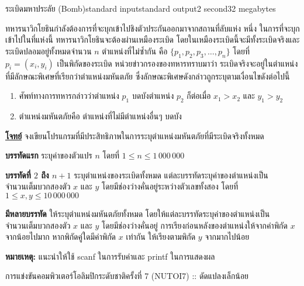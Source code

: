 \documentclass[11pt,a4paper]{article}
\begin{document}
\begin{problem}{ระเบิดมหาประลัย (Bomb)}{standard input}{standard output}{2 second}{32 megabytes}

ทหารนาวิกโยธินกำลังต้องการที่จะบุกเข้าไปชิงตัวประกันออกมาจากสถานที่ลับแห่ง หนึ่ง ในการที่จะบุกเข้าไปในที่แห่งนี้ ทหารนาวิกโยธินจะต้องผ่านเหมืองระเบิด โดยในเหมืองระเบิดนี้จะมีทั้งระเบิดจริงและระเบิดปลอมอยู่ทั้งหมดจำนวน $n$ ตำแหน่งที่ไม่ซ้ำกัน คือ $\{p_1,p_2,p_3,…,p_n\}$ โดยที่ $p_i = (x_i,y_i)$ เป็นพิกัดของระเบิด หน่วยข่าวกรองของทหารทราบมาว่า ระเบิดจริงจะอยู่ในตำแหน่งที่มีลักษณะพิเศษที่เรียกว่าตำแหน่งมหันตภัย ซึ่งลักษณะพิเศษดังกล่าวถูกระบุตามเงื่อนไขดังต่อไปนี้

\begin{enumerate}

\item ศัพท์ทางการทหารกล่าวว่าตำแหน่ง $p_1$ บดบังตำแหน่ง $p_2$ ก็ต่อเมื่อ $x_1 > x_2$ และ $y_1 > y_2$
\item ตำแหน่งมหันตภัยคือ ตำแหน่งที่ไม่มีตำแหน่งอื่นๆ บดบัง
\end{enumerate}


\bigskip
\underline{\textbf{โจทย์}}  จงเขียนโปรแกรมที่มีประสิทธิภาพในการระบุตำแหน่งมหันตภัยที่มีระเบิดจริงทั้งหมด


\InputFile

\textbf{บรรทัดแรก} ระบุค่าของตัวแปร $n$ โดยที่ $1 \leq n \leq 1\,000
\,000$

\textbf{บรรทัดที่ $2$ ถึง $n+1$} ระบุตำแหน่งของระเบิดทั้งหมด แต่ละบรรทัดระบุค่าของตำแหน่งเป็นจำนวนเต็มบวกสองตัว $x$ และ $y$ โดยมีช่องว่างคั่นอยู่ระหว่างตัวเลขทั้งสอง โดยที่ $1 \leq x, y \leq 10\,000\,000$


\OutputFile

\textbf{มีหลายบรรทัด} ให้ระบุตำแหน่งมหันตภัยทั้งหมด โดยให้แต่ละบรรทัดระบุค่าของตำแหน่งเป็นจำนวนเต็มบวกสองตัว $x$ และ $y$ โดยมีช่องว่างคั่นอยู่ การเรียงก่อนหลังของตำแหน่งให้จากค่าพิกัด $x$ จากน้อยไปมาก หากพิกัดคู่ใดมีค่าพิกัด $x$ เท่ากัน ให้เรียงตามพิกัด $y$ จากมากไปน้อย

\textbf{หมายเหตุ:} แนะนำให้ใช้ scanf ในการรับค่าและ printf ในการแสดงผล

\Examples

\begin{example}
%
%
\end{example}


\Source

การแข่งขันคอมพิวเตอร์โอลิมปิกระดับชาติครั้งที่ 7 (NUTOI7) :: ดัดแปลงเล็กน้อย

\end{problem}
\end{document}
